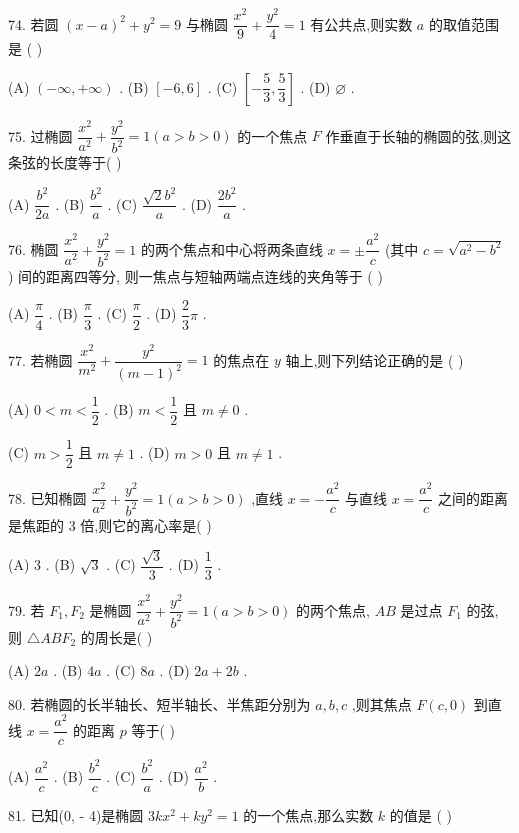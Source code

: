 74. 若圆 ${\left( x - a\right) }^{2} + {y}^{2} = 9$ 与椭圆 $\dfrac{{x}^{2}}{9} + \dfrac{{y}^{2}}{4} = 1$ 有公共点,则实数 $a$ 的取值范围是 (   )

(A) $\left( {-\infty , + \infty }\right)$ . (B) $\left\lbrack  {-6,6}\right\rbrack$ . (C) $\left\lbrack  {-\dfrac{5}{3},\dfrac{5}{3}}\right\rbrack$ . (D) $\varnothing$ .

75. 过椭圆 $\dfrac{{x}^{2}}{{a}^{2}} + \dfrac{{y}^{2}}{{b}^{2}} = 1\left( {a > b > 0}\right)$ 的一个焦点 $F$ 作垂直于长轴的椭圆的弦,则这条弦的长度等于(   )

(A) $\dfrac{{b}^{2}}{2a}$ . (B) $\dfrac{{b}^{2}}{a}$ . (C) $\dfrac{\sqrt{2}{b}^{2}}{a}$ . (D) $\dfrac{2{b}^{2}}{a}$ .

76. 椭圆 $\dfrac{{x}^{2}}{{a}^{2}} + \dfrac{{y}^{2}}{{b}^{2}} = 1$ 的两个焦点和中心将两条直线 $x =  \pm  \dfrac{{a}^{2}}{c}$ (其中 $c = \sqrt{{a}^{2} - {b}^{2}}$ ) 间的距离四等分, 则一焦点与短轴两端点连线的夹角等于 (   )

(A) $\dfrac{\pi }{4}$ . (B) $\dfrac{\pi }{3}$ . (C) $\dfrac{\pi }{2}$ . (D) $\dfrac{2}{3}\pi$ .

77. 若椭圆 $\dfrac{{x}^{2}}{{m}^{2}} + \dfrac{{y}^{2}}{{\left( m - 1\right) }^{2}} = 1$ 的焦点在 $y$ 轴上,则下列结论正确的是 (   )

(A) $0 < m < \dfrac{1}{2}$ . (B) $m < \dfrac{1}{2}$ 且 $m \neq  0$ .

(C) $m > \dfrac{1}{2}$ 且 $m \neq  1$ . (D) $m > 0$ 且 $m \neq  1$ .

78. 已知椭圆 $\dfrac{{x}^{2}}{{a}^{2}} + \dfrac{{y}^{2}}{{b}^{2}} = 1\left( {a > b > 0}\right)$ ,直线 $x =  - \dfrac{{a}^{2}}{c}$ 与直线 $x = \dfrac{{a}^{2}}{c}$ 之间的距离是焦距的 3 倍,则它的离心率是(   )

(A) 3 . (B) $\sqrt{3}$ . (C) $\dfrac{\sqrt{3}}{3}$ . (D) $\dfrac{1}{3}$ .

79. 若 ${F}_{1},{F}_{2}$ 是椭圆 $\dfrac{{x}^{2}}{{a}^{2}} + \dfrac{{y}^{2}}{{b}^{2}} = 1\left( {a > b > 0}\right)$ 的两个焦点, ${AB}$ 是过点 ${F}_{1}$ 的弦,则 $\bigtriangleup  {AB}{F}_{2}$ 的周长是(   )

(A) ${2a}$ . (B) ${4a}$ . (C) ${8a}$ . (D) ${2a} + {2b}$ .

80. 若椭圆的长半轴长、短半轴长、半焦距分别为 $a,b,c$ ,则其焦点 $F\left( {c,0}\right)$ 到直线 $x = \dfrac{{a}^{2}}{c}$ 的距离 $p$ 等于(   )

(A) $\dfrac{{a}^{2}}{c}$ . (B) $\dfrac{{b}^{2}}{c}$ . (C) $\dfrac{{b}^{2}}{a}$ . (D) $\dfrac{{a}^{2}}{b}$ .

81. 已知(0, - 4)是椭圆 ${3k}{x}^{2} + k{y}^{2} = 1$ 的一个焦点,那么实数 $k$ 的值是 ( )

